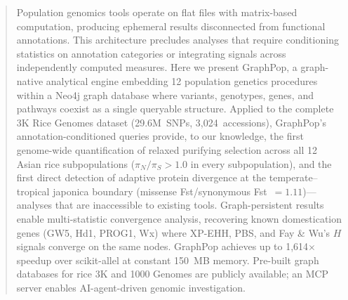 \begin{abstract}
\noindent
Population genomics tools operate on flat files with matrix-based computation, producing ephemeral results disconnected from functional annotations. This architecture precludes analyses that require conditioning statistics on annotation categories or integrating signals across independently computed measures. Here we present GraphPop, a graph-native analytical engine embedding 12 population genetics procedures within a Neo4j graph database where variants, genotypes, genes, and pathways coexist as a single queryable structure. Applied to the complete 3K Rice Genomes dataset (29.6M~SNPs, 3{,}024~accessions), GraphPop's annotation-conditioned queries provide, to our knowledge, the first genome-wide quantification of relaxed purifying selection across all 12 Asian rice subpopulations ($\pi_N/\pi_S > 1.0$ in every subpopulation), and the first direct detection of adaptive protein divergence at the temperate--tropical japonica boundary (missense Fst/synonymous Fst~$= 1.11$)---analyses that are inaccessible to existing tools. Graph-persistent results enable multi-statistic convergence analysis, recovering known domestication genes (GW5, Hd1, PROG1, Wx) where XP-EHH, PBS, and Fay \& Wu's $H$ signals converge on the same nodes. GraphPop achieves up to 1{,}614$\times$ speedup over scikit-allel at constant 150~MB memory. Pre-built graph databases for rice 3K and 1000 Genomes are publicly available; an MCP server enables AI-agent-driven genomic investigation.
\end{abstract}
